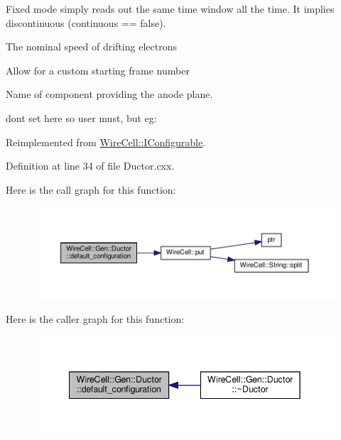 Fixed mode simply reads out the same time window all the time. It implies discontinuous (continuous == false).

The nominal speed of drifting electrons

Allow for a custom starting frame number

Name of component providing the anode plane.

don\textquotesingle{}t set here so user must, but eg\+: 

Reimplemented from \hyperlink{class_wire_cell_1_1_i_configurable_a54841b2da3d1ea02189478bff96f7998}{Wire\+Cell\+::\+I\+Configurable}.



Definition at line 34 of file Ductor.\+cxx.

Here is the call graph for this function\+:
\nopagebreak
\begin{figure}[H]
\begin{center}
\leavevmode
\includegraphics[width=350pt]{class_wire_cell_1_1_gen_1_1_ductor_ab9486eb33932f6f7c0ff321675829178_cgraph}
\end{center}
\end{figure}
Here is the caller graph for this function\+:
\nopagebreak
\begin{figure}[H]
\begin{center}
\leavevmode
\includegraphics[width=342pt]{class_wire_cell_1_1_gen_1_1_ductor_ab9486eb33932f6f7c0ff321675829178_icgraph}
\end{center}
\end{figure}
\mbox{\label{class_wire_cell_1_1_gen_1_1_ductor_a1a103a685f920781c7d312f168b52841}} 
